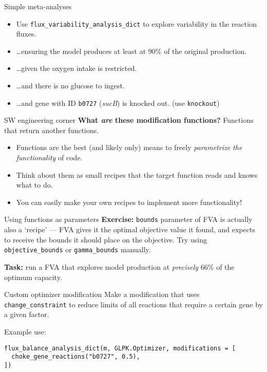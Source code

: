 \documentclass[aspectratio=169]{beamer}
\begin{document}
\begin{frame}[fragile]{Simple meta-analyses}
\begin{itemize}
\item Use \verb|flux_variability_analysis_dict| to explore variability in the reaction fluxes.
\item \dots ensuring the model produces at least at 90\% of the original production.
\item \dots given the oxygen intake is restricted.
\item \dots and there is no glucose to ingest.
\item \dots and gene with ID \texttt{b0727} (\emph{sucB}) is knocked out. (use \verb|knockout|)
\end{itemize}
\end{frame}

\begin{frame}[fragile]{SW engineering corner}
\textbf{What \emph{are} these modification functions?}
\pause
Functions that return another functions.
\bigskip\footnotesize
\begin{itemize}
\item Functions are the best (and likely only) means to freely \emph{parametrize the functionality} of code.
\item Think about them as small recipes that the target function reads and knows what to do.
\item You can easily make your own recipes to implement more functionality!
\end{itemize}
\end{frame}

\begin{frame}[fragile]{Using functions as parameters}
\textbf{Exercise:} \verb|bounds| parameter of FVA is actually also a `recipe' --- FVA gives it the optimal objective value it found, and expects to receive the bounds it should place on the objective. Try using \verb|objective_bounds| or \verb|gamma_bounds| manually.

\bigskip
\textbf{Task:} run a FVA that explores model production at \emph{precisely} 66\% of the optimum capacity.
\end{frame}

\begin{frame}[fragile]{Custom optimizer modification}
Make a modification that uses \verb|change_constraint| to reduce limits of all reactions that require a certain gene by a given factor.

Example use:
\begin{verbatim}
flux_balance_analysis_dict(m, GLPK.Optimizer, modifications = [
  choke_gene_reactions("b0727", 0.5),
])
\end{verbatim}
\end{frame}
\end{document}
